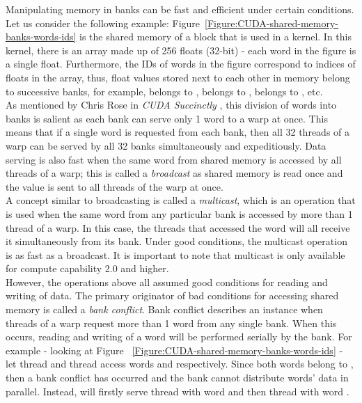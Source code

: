 Manipulating memory in banks can be fast and efficient under certain conditions. Let us consider the following example: Figure~\ref{Figure:CUDA-shared-memory-banks-words-ids} is the shared memory of a block that is used in a kernel. In this kernel, there is an array made up of 256 floats (32-bit) - each word in the figure is a single float. Furthermore, the IDs of words in the figure correspond to indices of floats in the array, thus, float values stored next to each other in memory belong to successive banks, for example,  belongs to ,  belongs to ,  belongs to , etc. \\
As mentioned by Chris Rose in \emph{CUDA Succinctly} \cite{Rose2017}, this division of words into banks is salient as each bank can serve only 1 word to a warp at once. This means that if a single word is requested from each bank, then all 32 threads of a warp can be served by all 32 banks simultaneously and expeditiously. Data serving is also fast when the same word from shared memory is accessed by all threads of a warp; this is called a \textit{broadcast} as shared memory is read once and the value is sent to all threads of the warp at once. \\
A concept similar to broadcasting is called a \textit{multicast}, which is an operation that is used when the same word from any particular bank is accessed by more than 1 thread of a warp. In this case, the threads that accessed the word will all receive it simultaneously from its bank. Under good conditions, the multicast operation is as fast as a broadcast. It is important to note that multicast is only available for compute capability 2.0 and higher. \\
However, the operations above all assumed good conditions for reading and writing of data. The primary originator of bad conditions for accessing shared memory is called a \textit{bank conflict}. Bank conflict describes an instance when threads of a warp request more than 1 word from any single bank. When this occurs, reading and writing of a word will be performed serially by the bank. For example - looking at Figure ~\ref{Figure:CUDA-shared-memory-banks-words-ids} - let thread  and thread  access words  and  respectively. Since both words belong to , then a bank conflict has occurred and the bank cannot distribute words' data in parallel. Instead,  will firstly serve thread  with word  and then thread  with word . \\
